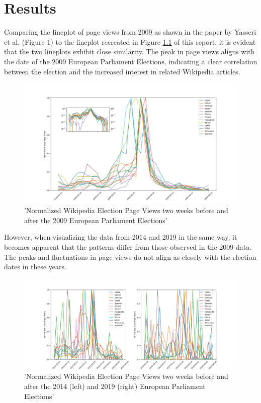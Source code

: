 \chapter{Results}
\label{sec:results}

Comparing the lineplot of page views from 2009 as shown in the paper by Yasseri et al. (Figure 1) to the lineplot recreated in Figure \ref{fig:figure1} of this report, it is evident that the two lineplots exhibit close similarity. The peak in page views aligns with the date of the 2009 European Parliament Elections, indicating a clear correlation between the election and the increased interest in related Wikipedia articles. 
\begin{figure}[]
    \centering
    \includegraphics[width=\textwidth]{fig/lineplot_2009.png}
    \caption{'Normalized Wikipedia Election Page Views two weeks before and after the 2009 European Parliament Elections'}
    \label{fig:figure1}
\end{figure} 
However, when visualizing the data from 2014 and 2019 in the same way, it becomes apparent that the patterns differ from those observed in the 2009 data. The peaks and fluctuations in page views do not align as closely with the election dates in these years. 
\begin{figure}[t!]
    \centering
    \includegraphics[width=\textwidth]{fig/lineplot_2014_2019.png}
    \caption{'Normalized Wikipedia Election Page Views two weeks before and after the 2014 (left) and 2019 (right) European Parliament Elections'}
    \label{fig:figure2}
\end{figure}

